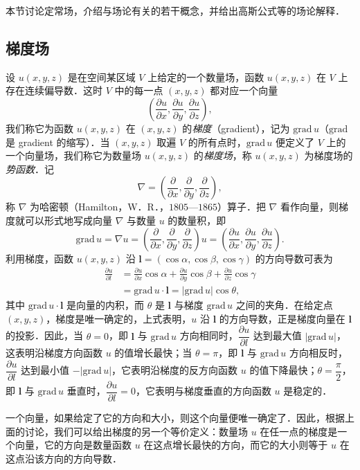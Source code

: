 本节讨论定常场，介绍与场论有关的若干概念，并给出高斯公式等的场论解释．

\subsection{梯度场}

设 $u(x,y,z)$ 是在空间某区域 $V$ 上给定的一个数量场，函数 $u(x,y,z)$ 在 $V$ 上存在连续偏导数．这时 $V$ 中的每一点 $(x,y,z)$ 都对应一个向量
\[
\left(\frac{\partial u}{\partial x},\frac{\partial u}{\partial y},\frac{\partial u}{\partial z}\right),
\]
我们称它为函数 $u(x,y,z)$ 在 $(x,y,z)$ 的\emph{梯度}（gradient），记为 $\mathrm{grad}\,u$（$\mathrm{grad}$ 是 gradient 的缩写）．当 $(x,y,z)$ 取遍 $V$ 的所有点时，$\mathrm{grad}\,u$ 便定义了 $V$ 上的一个向量场，我们称它为数量场 $u(x,y,z)$ 的\emph{梯度场}，称 $u(x,y,z)$ 为梯度场的\emph{势函数}．记
\[
\nabla=\left(\frac{\partial}{\partial x},\frac{\partial}{\partial y},\frac{\partial}{\partial z}\right),
\]
称 $\nabla$ 为哈密顿（Hamilton，W．R．，$1805$—$1865$）算子．把 $\nabla$ 看作向量，则梯度就可以形式地写成向量 $\nabla$ 与数量 $u$ 的数量积，即
\[
\mathrm{grad}\,u=\nabla u=\left(\frac{\partial}{\partial x},\frac{\partial}{\partial y},\frac{\partial}{\partial z}\right)u=\left(\frac{\partial u}{\partial x},\frac{\partial u}{\partial y},\frac{\partial u}{\partial z}\right).
\]
利用梯度，函数 $u(x,y,z)$ 沿 $\bm{l}=(\cos\alpha,\cos\beta,\cos\gamma)$ 的方向导数可表为
\[
\begin{aligned}
\frac{\partial u}{\partial l}&=\frac{\partial u}{\partial x}\cos\alpha+\frac{\partial u}{\partial y}\cos\beta+\frac{\partial u}{\partial z}\cos\gamma\\
&=\mathrm{grad}\,u\cdot\bm{l}=|\mathrm{grad}\,u|\cos\theta,
\end{aligned}
\]
其中 $\mathrm{grad}\,u\cdot\bm{l}$ 是向量的内积，而 $\theta$ 是 $\bm{l}$ 与梯度 $\mathrm{grad}\,u$ 之间的夹角．在给定点 $(x,y,z)$，梯度是唯一确定的，上式表明，$u$ 沿 $\bm{l}$ 的方向导数，正是梯度向量在 $\bm{l}$ 的投影．因此，当 $\theta=0$，即 $\bm{l}$ 与 $\mathrm{grad}\,u$ 方向相同时，$\dfrac{\partial u}{\partial l}$ 达到最大值 $|\mathrm{grad}\,u|$，这表明沿梯度方向函数 $u$ 的值增长最快；当 $\theta=\pi$，即 $\bm{l}$ 与 $\mathrm{grad}\,u$ 方向相反时，$\dfrac{\partial u}{\partial l}$ 达到最小值 $-|\mathrm{grad}\,u|$，它表明沿梯度的反方向函数 $u$ 的值下降最快；$\theta=\dfrac{\pi}{2}$，即 $\bm{l}$ 与 $\mathrm{grad}\,u$ 垂直时，$\dfrac{\partial u}{\partial l}=0$，它表明与梯度垂直的方向函数 $u$ 是稳定的．

一个向量，如果给定了它的方向和大小，则这个向量便唯一确定了．因此，根据上面的讨论，我们可以给出梯度的另一个等价定义：数量场 $u$ 在任一点的梯度是一个向量，它的方向是数量函数 $u$ 在这点增长最快的方向，而它的大小则等于 $u$ 在这点沿该方向的方向导数．

